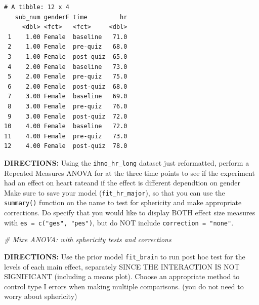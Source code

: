 \documentclass[]{article}
\newenvironment{Shaded}{\begin{snugshade}}{\end{snugshade}}
\newcommand{\KeywordTok}[1]{\textcolor[rgb]{0.13,0.29,0.53}{\textbf{#1}}}
\newcommand{\DataTypeTok}[1]{\textcolor[rgb]{0.13,0.29,0.53}{#1}}
\newcommand{\DecValTok}[1]{\textcolor[rgb]{0.00,0.00,0.81}{#1}}
\newcommand{\StringTok}[1]{\textcolor[rgb]{0.31,0.60,0.02}{#1}}
\newcommand{\CommentTok}[1]{\textcolor[rgb]{0.56,0.35,0.01}{\textit{#1}}}
\newcommand{\OperatorTok}[1]{\textcolor[rgb]{0.81,0.36,0.00}{\textbf{#1}}}
\newcommand{\NormalTok}[1]{#1}
\begin{document}
\begin{Shaded}
\end{Shaded}

\begin{verbatim}
# A tibble: 12 x 4
   sub_num genderF time         hr
     <dbl> <fct>   <fct>     <dbl>
 1    1.00 Female  baseline   71.0
 2    1.00 Female  pre-quiz   68.0
 3    1.00 Female  post-quiz  65.0
 4    2.00 Female  baseline   73.0
 5    2.00 Female  pre-quiz   75.0
 6    2.00 Female  post-quiz  68.0
 7    3.00 Female  baseline   69.0
 8    3.00 Female  pre-quiz   76.0
 9    3.00 Female  post-quiz  72.0
10    4.00 Female  baseline   72.0
11    4.00 Female  pre-quiz   73.0
12    4.00 Female  post-quiz  78.0
\end{verbatim}

\clearpage

\textbf{DIRECTIONS:} Using the \texttt{ihno\_hr\_long} dataset just
reformatted, perform a Repeated Measures ANOVA for at the three time
points to see if the experiment had an effect on heart rateand if the
effect is different dependtion on gender Make sure to save your model
(\texttt{fit\_hr\_major}), so that you can use the \texttt{summary()}
function on the name to test for sphericity and make appropriate
corrections. Do specify that you would like to display BOTH effect size
measures with \texttt{es\ =\ c("ges",\ "pes")}, but do NOT include
\texttt{correction\ =\ "none"}.

\begin{Shaded}
\begin{Highlighting}[]
\CommentTok{# Mixe ANOVA:  with sphericity tests and corrections}
\end{Highlighting}
\end{Shaded}

\clearpage

\textbf{DIRECTIONS:} Use the prior model \texttt{fit\_brain} to run post
hoc test for the levels of each main effect, separately SINCE THE
INTERACTION IS NOT SIGNIFICANT (including a means plot). Choose an
appropriate method to control type I errors when making multiple
comparisons. (you do not need to worry about sphericity)
\end{document}
